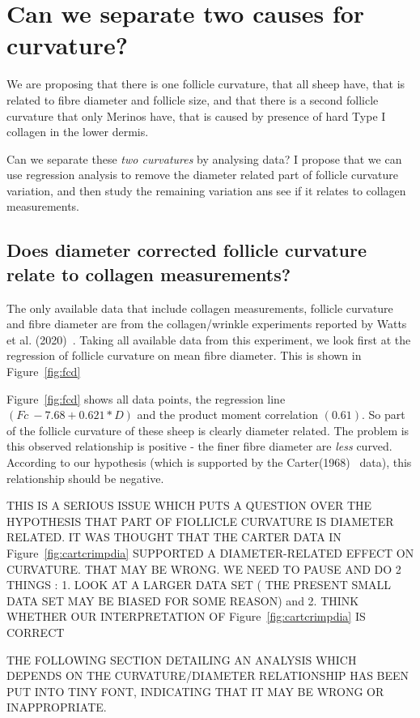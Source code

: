 \documentclass{article}
\begin{document}
\section{Can we separate two causes for curvature?}
We are proposing that there is one follicle curvature, that all sheep have, that is related to fibre diameter and follicle size, and that there is a second follicle curvature that only Merinos have, that is caused by  presence of hard Type I collagen in the lower dermis.

Can we separate these {\em two curvatures} by analysing data?  I propose that we can use regression analysis to remove the diameter related part of follicle curvature variation, and then study the remaining variation ans see if it relates to collagen measurements.

\subsection{ Does diameter corrected follicle curvature relate to collagen measurements?}
The only available data that include collagen measurements, follicle curvature and fibre diameter are  from the collagen/wrinkle experiments reported by Watts et al. (2020)~\cite{watts-2020}. Taking all available data from this experiment, we look first at the regression of follicle curvature on mean fibre diameter. This is shown in Figure~\ref{fig:fcd}

Figure~\ref{fig:fcd} shows all data points, the regression line $(Fc ~  -7.68   + 0.621 * D)$ and the product moment correlation $(0.61)$. So part of the follicle curvature of these sheep is clearly diameter related.  The problem is this observed relationship is positive - the finer fibre diameter are {\em less} curved. According to our hypothesis (which is supported by the Carter(1968)~\cite{carter-1968} data), this relationship should be negative. 

THIS IS A SERIOUS ISSUE WHICH PUTS A QUESTION OVER THE HYPOTHESIS THAT PART OF FIOLLICLE CURVATURE IS DIAMETER RELATED. IT WAS THOUGHT THAT THE CARTER DATA IN Figure~\ref{fig:cartcrimpdia} SUPPORTED A DIAMETER-RELATED EFFECT ON CURVATURE. THAT MAY BE WRONG. WE NEED TO PAUSE AND DO 2 THINGS : 1. LOOK AT A LARGER DATA SET ( THE PRESENT SMALL DATA SET MAY BE BIASED FOR SOME REASON) and 2. THINK WHETHER OUR INTERPRETATION OF  Figure~\ref{fig:cartcrimpdia} IS CORRECT

THE FOLLOWING SECTION DETAILING AN ANALYSIS WHICH DEPENDS ON THE CURVATURE/DIAMETER RELATIONSHIP HAS BEEN PUT INTO TINY FONT, INDICATING THAT IT MAY BE WRONG OR INAPPROPRIATE. 
\end{document}
